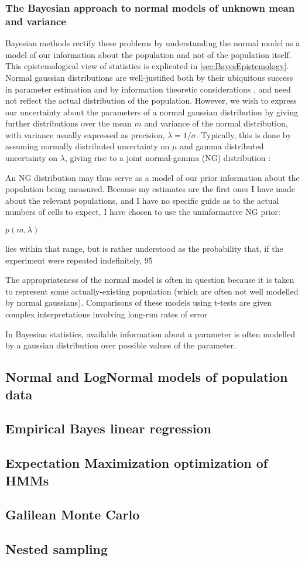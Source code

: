 \subsubsection{The Bayesian approach to normal models of unknown mean and variance}
Bayesian methods rectify these problems by understanding the normal model as a model of our information about the population and not of the population itself. This epistemological view of statistics is explicated in \autoref{sec:BayesEpistemology}. Normal gaussian distributions are well-justified both by their ubiquitous success in parameter estimation and by information theoretic considerations \cite{Jaynes2003}, and need not reflect the actual distribution of the population. However, we wish to express our uncertainty about the parameters of a normal gaussian distribution by giving further distributions over the mean $m$ and variance of the normal distribution, with variance usually expressed as precision, $\lambda = 1/\sigma$. Typically, this is done by  assuming normally distributed uncertainty on $\mu$ and gamma distributed uncertainty on $\lambda$, giving rise to a joint normal-gamma (NG) distribution \cite{Bernardo2000}:

An NG distribution may thus serve as a model of our prior information about the population being measured. Because my estimates are the first ones I have made about the relevant populations, and I have no specific guide as to the actual numbers of cells to expect, I have chosen to use the uninformative NG prior:

$p(m,\lambda)$

lies within that range, but is rather understood as the probability that, if the experiment were repeated indefinitely, 95

The appropriateness of the normal model is often in question because it is taken to represent some actually-existing population (which are often not well modelled by normal gaussians). Comparisons of these models using t-tests are given complex interpretations involving long-run rates of error

In Bayesian statistics, available information about a parameter is often modelled by a gaussian distribution over possible values of the parameter. 
\subsection{Normal and LogNormal models of population data}
\label{ssec:NormalModels}

\subsection{Empirical Bayes linear regression}
\label{ssec:EmpiricalBayes}

\subsection{Expectation Maximization optimization of HMMs}
\label{ssec:EM}

\subsection{Galilean Monte Carlo}
\label{ssec:GMC}

\subsection{Nested sampling}
\label{ssec:nested}